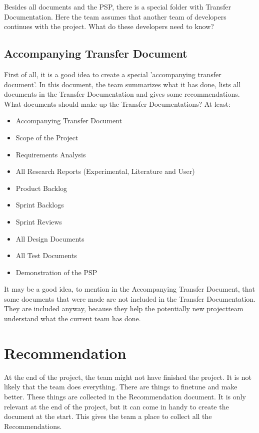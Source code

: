 \documentclass[10pt]{report}
\begin{document}
Besides all documents and the PSP, there is a special folder with Transfer Documentation. Here the team assumes that another team of developers continues with the project. What do these developers need to know?

\subsection{Accompanying Transfer Document}

 First of all, it is a good idea to create a special 'accompanying transfer document'. In this document, the team summarizes what it has done, lists all documents in the Transfer Documentation and gives some recommendations. What documents should make up the Transfer Documentations? At least:

\begin{itemize}
	\item Accompanying Transfer Document
	\item Scope of the Project
	\item Requirements Analysis
	\item All Research Reports (Experimental, Literature and User)
	\item Product Backlog
	\item Sprint Backlogs
	\item Sprint Reviews
	\item All Design Documents
	\item All Test Documents
	\item Demonstration of the PSP
\end{itemize}

It may be a good idea, to mention in the Accompanying Transfer Document, that some documents that were made are not included in the Transfer Documentation. They are included anyway, because they help the potentially new projectteam understand what the current team has done.

\newpage


\section{Recommendation}

At the end of the project, the team might not have finished the project. It is not likely that the team does everything. There are things to finetune and make better. These things are collected in the Recommendation document. It is only relevant at the end of the project, but it can come in handy to create the document at the start. This gives the team a place to collect all the Recommendations.
\end{document}
